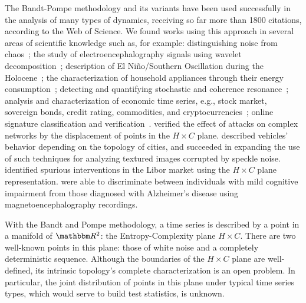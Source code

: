 \documentclass[alpha-refs]{wiley-article}
\begin{document}
The Bandt-Pompe methodology and its variants have been used successfully in the analysis of many types of dynamics, receiving so far more than \num{1800} citations, according to the Web of Science.
We found works using this approach in several areas of scientific knowledge such as, for example:
%
distinguishing noise from chaos~\citep{rosso2007distinguishing};
%
the study of electroencephalography signals using wavelet decomposition~\citep{baravalle2018discriminating,baravalle2018rhythmic};
%
description of El Niño/Southern Oscillation during the Holocene~\citep{saco2010entropy};
%
the characterization of household appliances through their energy consumption~\citep{CharacterizationElectricLoadInformationTheoryQuantifiers};
%
detecting and quantifying stochastic and coherence resonance~\citep{rosso2009detectinga, rosso2009detectingb};
%
analysis and characterization of economic time series, e.g., stock market, sovereign bonds, credit rating, commodities, and cryptocurrencies~\citep{zunino2010complexity, zunino2012efficiency, bariviera2013efficiency, bariviera2018analysis, Araujo2019permutation};
%
online signature classification and verification~\citep{ClassificationVerificationOnlineHandwrittenSignatures}.
\cite{InformationTheoryPerspectiveNetworkRobustness} verified the effect of attacks on complex networks by the displacement of points in the $H \times C$ plane.
\citet{CharacterizationVehicleBehaviorInformationTheory} described vehicles' behavior depending on the topology of cities, and
\citet{Chagas2020Characterization} succeeded in expanding the use of such techniques for analyzing textured images corrupted by speckle noise.
\citet{LiborInvisibleHand} identified spurious interventions in the Libor market using the $H\times C$ plane representation.
\citet{echegoyen2020permutation} were able to discriminate between individuals with mild cognitive impairment from those diagnosed with Alzheimer's disease using magnetoencephalography recordings.


With the Bandt and Pompe methodology, a time series is described by a point in a manifold of $\mathbbm R^2$: the Entropy-Complexity plane $H\times C$.
There are two well-known points in this plane: those of white noise and a completely deterministic sequence.
Although the boundaries of the $H\times C$ plane are well-defined, its intrinsic topology's complete characterization is an open problem.
In particular, the joint distribution of points in this plane under typical time series types, which would serve to build test statistics, is unknown.
\end{document}
